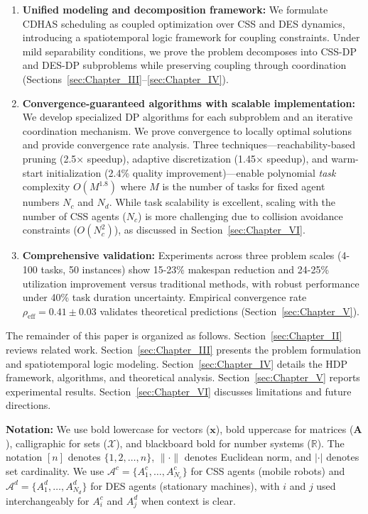 \documentclass[manuscript,screen,review]{acmart}
\begin{document}
\begin{enumerate}[leftmargin=*]
    \item \textbf{Unified modeling and decomposition framework:} We formulate 
    CDHAS scheduling as coupled optimization over CSS and DES dynamics, introducing 
    a spatiotemporal logic framework for coupling constraints. Under mild 
    separability conditions, we prove the problem decomposes into CSS-DP and 
    DES-DP subproblems while preserving coupling through coordination 
    (Sections~\ref{sec:Chapter_III}--\ref{sec:Chapter_IV}).
    
    \item \textbf{Convergence-guaranteed algorithms with scalable implementation:} 
    We develop specialized DP algorithms for each subproblem and an iterative 
    coordination mechanism. We prove convergence to locally optimal solutions 
    and provide convergence rate analysis. Three techniques—reachability-based pruning (2.5× speedup), adaptive 
discretization (1.45× speedup), and warm-start initialization (2.4\% quality 
improvement)—enable polynomial \textit{task} complexity $O(M^{1.8})$ where $M$ is the number of tasks for fixed agent 
    numbers $N_c$ and $N_d$. While task scalability is excellent, scaling with the number of CSS agents 
($N_c$) is more challenging due to collision avoidance constraints ($O(N_c^2)$), 
as discussed in Section~\ref{sec:Chapter_VI}.
    
    \item \textbf{Comprehensive validation:} Experiments across three problem 
    scales (4-100 tasks, 50 instances) show 15-23\% makespan reduction and 
    24-25\% utilization improvement versus traditional methods, with robust 
    performance under 40\% task duration uncertainty. Empirical convergence 
    rate $\rho_{\text{eff}} = 0.41 \pm 0.03$ validates theoretical predictions 
    (Section~\ref{sec:Chapter_V}).
\end{enumerate}

The remainder of this paper is organized as follows. Section~\ref{sec:Chapter_II} 
reviews related work. Section~\ref{sec:Chapter_III} presents the problem 
formulation and spatiotemporal logic modeling. Section~\ref{sec:Chapter_IV} 
details the HDP framework, algorithms, and theoretical analysis. 
Section~\ref{sec:Chapter_V} reports experimental results. 
Section~\ref{sec:Chapter_VI} discusses limitations and future directions.

\textbf{Notation:} We use bold lowercase for vectors ($\mathbf{x}$), bold 
uppercase for matrices ($\mathbf{A}$), calligraphic for sets ($\mathcal{X}$), 
and blackboard bold for number systems ($\mathbb{R}$). The notation $[n]$ 
denotes $\{1, 2, \ldots, n\}$, $\|\cdot\|$ denotes Euclidean norm, and 
$|\cdot|$ denotes set cardinality. We use $\mathcal{A}^c = \{A_1^c, \ldots, A_{N_c}^c\}$ 
for CSS agents (mobile robots) and $\mathcal{A}^d = \{A_1^d, \ldots, A_{N_d}^d\}$ 
for DES agents (stationary machines), with $i$ and $j$ used interchangeably 
for $A_i^c$ and $A_j^d$ when context is clear.
\end{document}
